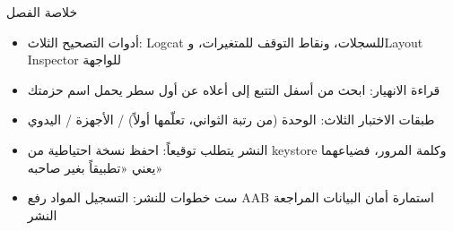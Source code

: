 \begin{tcbsummary}{خلاصة الفصل}
\begin{itemize}
  \item أدوات التصحيح الثلاث: Logcat للسجلات، ونقاط التوقف للمتغيرات، وLayout Inspector للواجهة
  \item قراءة الانهيار: ابحث من أسفل التتبع إلى أعلاه عن أول سطر يحمل اسم حزمتك
  \item طبقات الاختبار الثلاث: الوحدة (من رتبة الثواني، تعلّمها أولاً) / الأجهزة / اليدوي
  \item النشر يتطلب توقيعاً: احفظ نسخة احتياطية من keystore وكلمة المرور، فضياعهما يعني «تطبيقاً بغير صاحبه»
  \item ست خطوات للنشر: التسجيل المواد رفع AAB استمارة أمان البيانات المراجعة النشر
\end{itemize}

\end{tcbsummary}
